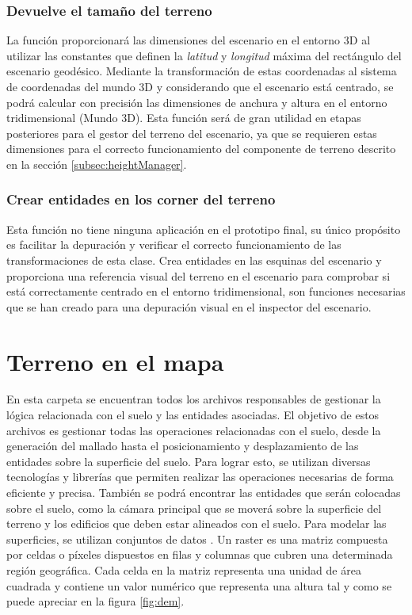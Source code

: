 \documentclass[a4paper, 11pt]{book}
\begin{document}
\subsubsection{Devuelve el tamaño del terreno}
\label{funcion:getGroundSize}
La función proporcionará las dimensiones del escenario en el entorno \textsc{3D} al utilizar las constantes que definen la \emph{latitud} y \emph{longitud} máxima del rectángulo del escenario geodésico. Mediante la transformación de estas coordenadas al sistema de coordenadas del mundo \textsc{3D} y considerando que el escenario está centrado, se podrá calcular con precisión las dimensiones de anchura y altura en el entorno tridimensional (Mundo 3D). Esta función será de gran utilidad en etapas posteriores para el gestor del terreno del escenario, ya que se requieren estas dimensiones para el correcto funcionamiento del componente de terreno descrito en la sección \ref{subsec:heightManager}.

\subsubsection{Crear entidades en los corner del terreno}
\label{funcion:createCorner}
Esta función no tiene ninguna aplicación en el prototipo final, su único propósito es facilitar la depuración y verificar el correcto funcionamiento de las transformaciones de esta clase. Crea entidades en las esquinas del escenario y proporciona una referencia visual del terreno en el escenario para comprobar si está correctamente centrado en el entorno tridimensional, son funciones necesarias que se han creado para una depuración visual en el inspector del escenario.
\clearpage
\section{Terreno en el mapa}
\label{sec:mapGround}
En esta carpeta se encuentran todos los archivos responsables de gestionar la lógica relacionada con el suelo y las entidades asociadas. El objetivo de estos archivos es gestionar todas las operaciones relacionadas con el suelo, desde la generación del mallado hasta el posicionamiento y desplazamiento de las entidades sobre la superficie del suelo. Para lograr esto, se utilizan diversas tecnologías y librerías que permiten realizar las operaciones necesarias de forma eficiente y precisa.
También se podrá encontrar las entidades que serán colocadas sobre el suelo, como la cámara principal que se moverá sobre la superficie del terreno y los edificios que deben estar alineados con el suelo. Para modelar las superficies, se utilizan conjuntos de datos . Un raster es una matriz compuesta por celdas o píxeles dispuestos en filas y columnas que cubren una determinada región geográfica.
Cada celda en la matriz representa una unidad de área cuadrada y contiene un valor numérico que representa una altura tal y como se puede apreciar en la figura \ref{fig:dem}.
\end{document}
